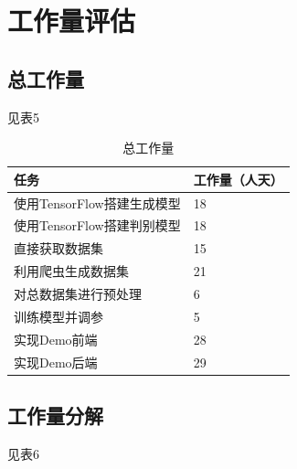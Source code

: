 \documentclass[hyperref, a4paper]{ctexart}
\begin{document}
\hypertarget{ux5de5ux4f5cux91cfux8bc4ux4f30}{%
\section{工作量评估}\label{ux5de5ux4f5cux91cfux8bc4ux4f30}}

\hypertarget{ux603bux5de5ux4f5cux91cf}{%
\subsection{总工作量}\label{ux603bux5de5ux4f5cux91cf}}

见表5

\begin{table}
    \caption{总工作量}
    \centering
    \begin{tabular}{|p{4.5cm}<{\centering}|p{2.0cm}<{\centering}|}
    \hline
    任务               & 工作量（人天） \\ \hline
    使用TensorFlow搭建生成模型 & 18       \\ \hline
    使用TensorFlow搭建判别模型 & 18       \\ \hline
    直接获取数据集         & 15       \\ \hline
    利用爬虫生成数据集         & 21       \\ \hline
    对总数据集进行预处理         & 6       \\ \hline
    训练模型并调参         & 5       \\ \hline
    实现Demo前端           & 28      \\ \hline
    实现Demo后端         & 29       \\ \hline
    \end{tabular}
\end{table}

\hypertarget{ux5de5ux4f5cux91cfux5206ux89e3}{%
\subsection{工作量分解}\label{ux5de5ux4f5cux91cfux5206ux89e3}}

见表6
\end{document}
